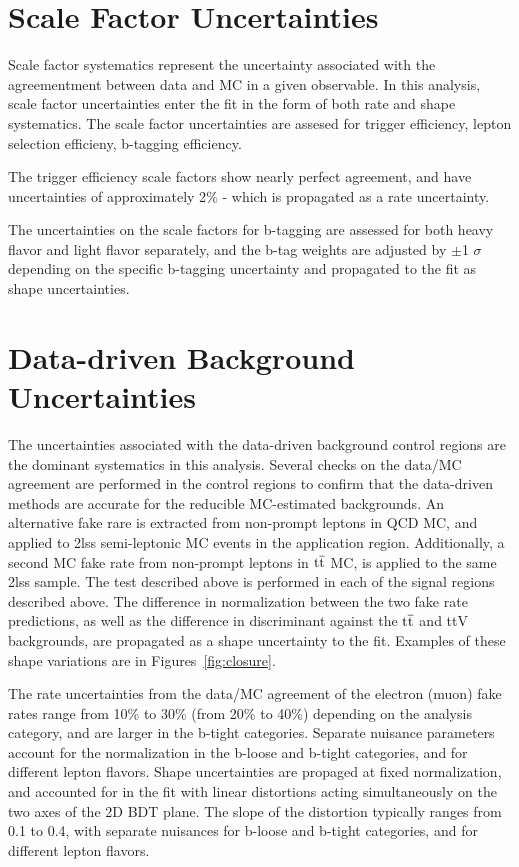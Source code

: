 
\section{Scale Factor Uncertainties}
Scale factor systematics represent the uncertainty associated with the agreementment between data and MC in a given observable. In this analysis,
scale factor uncertainties enter the fit in the form of both rate and shape systematics. The scale factor uncertainties are assesed for trigger efficiency,
lepton selection efficieny, b-tagging efficiency.


The trigger efficiency scale factors show nearly perfect agreement, and have uncertainties of approximately
2$\%$ - which is propagated as a rate uncertainty. 

The uncertainties on the scale factors for b-tagging are assessed for both heavy flavor and light flavor separately, and the b-tag weights are adjusted by
$\pm$1 $\sigma$ depending on the specific b-tagging uncertainty and propagated to the fit as shape uncertainties.


\section{Data-driven Background Uncertainties}
The uncertainties associated with the data-driven background control regions are the dominant systematics in this analysis. 
Several checks on the data/MC agreement are performed in the control regions to confirm that the data-driven methods are accurate for the reducible MC-estimated
backgrounds.
An alternative fake rare is extracted from non-prompt leptons in QCD MC, and applied to 2lss semi-leptonic \ttbar MC events in the application region.
Additionally, a second MC fake rate from non-prompt leptons in $\mathrm{t}\overline{\mathrm{t}}$ MC,  is applied to the same 2lss sample.
The test described above is performed in each of the signal regions described above. 
The difference in normalization between the two fake rate predictions, as well as the difference in discriminant against the $\mathrm{t}\overline{\mathrm{t}}$ and ttV backgrounds,
are propagated as a shape uncertainty to the fit. Examples of these shape variations are in Figures~\ref{fig:closure}.

The rate uncertainties from the data/MC agreement of the electron (muon) fake rates range from 10\% to 30\% (from 20\% to 40\%) depending on the analysis category,
and are larger in the b-tight categories. Separate nuisance parameters account for the normalization in the b-loose and b-tight categories, and for different lepton flavors.
Shape uncertainties are propaged at fixed normalization, and accounted for in the fit with linear distortions acting simultaneously on the two axes of the 2D BDT plane.
The slope of the distortion typically ranges from 0.1 to 0.4, with separate nuisances for b-loose and b-tight categories, and for different lepton flavors.

